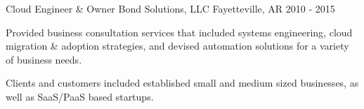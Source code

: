 \begin{cventries}
  \cventry
    {Cloud Engineer \& Owner} %
    {Bond Solutions, LLC} %
    {Fayetteville, AR} %
    {2010 - 2015} %
    {
      \begin{cvitems} %
        \item {Provided business consultation services that included systems engineering, cloud migration \& adoption strategies, and devised automation solutions for a variety of business needs.}
  \item {Clients and customers included established small and medium sized businesses, as well as SaaS/PaaS based startups.}
      \end{cvitems}
    }

\end{cventries}
